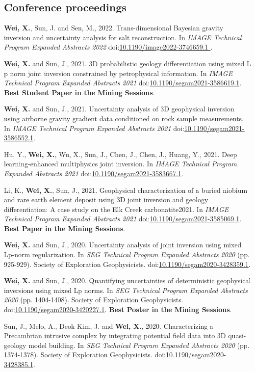 \documentclass[11pt, a4paper]{article}
\newcommand{\LastName}{Wei}
\newcommand{\Initials}{X}
\newcommand{\Wei}{\textbf{\LastName, \Initials.}}  %
\newcommand{\WeiSun}{\textbf{\LastName, \Initials.} and Sun, J.}  %
\newcommand{\DOI}[1]{doi:\href{https://doi.org/#1}{#1}}
\begin{document}
\subsection*{Conference proceedings}
\begin{etaremune}
	
	\item
	\Wei, Sun, J. and Sen, M., 2022. Trans-dimensional Bayesian gravity inversion and uncertainty analysis for salt reconstruction. In \emph{IMAGE Technical Program Expanded Abstracts 2022}  \DOI{10.1190/image2022-3746659.1
	}.

	\item
	\WeiSun, 2021. 3D probabilistic geology differentiation using mixed L p norm joint inversion constrained by petrophysical information. In \emph{IMAGE Technical Program Expanded Abstracts 2021} \DOI{10.1190/segam2021-3586619.1}. \textbf{Best Student Paper in the Mining Sessions}.

	\item
	\WeiSun, 2021. Uncertainty analysis of 3D geophysical inversion using airborne gravity gradient data conditioned on rock sample measurements. In \emph{IMAGE Technical Program Expanded Abstracts 2021} \DOI{10.1190/segam2021-3586552.1}.

	\item
	Hu, Y., \Wei, Wu, X., Sun, J., Chen, J., Chen, J., Huang, Y., 2021. Deep learning-enhanced multiphysics joint inversion. In \emph{IMAGE Technical Program Expanded Abstracts 2021} \DOI{10.1190/segam2021-3583667.1}.

	\item
	Li, K., \Wei, Sun, J., 2021. Geophysical characterization of a buried niobium and rare earth element deposit using 3D joint inversion and geology differentiation: A case study on the Elk Creek carbonatite2021. In \emph{IMAGE Technical Program Expanded Abstracts 2021} \DOI{10.1190/segam2021-3585069.1}. \textbf{Best Paper in the Mining Sessions}.

	\item
	\WeiSun, 2020. Uncertainty analysis of joint inversion using mixed Lp-norm regularization. In \emph{SEG Technical Program Expanded Abstracts 2020} (pp. 925-929). Society of Exploration Geophysicists. \DOI{10.1190/segam2020-3428359.1}.

	\item
	\WeiSun, 2020. Quantifying uncertainties of deterministic geophysical inversions using mixed Lp norms. In \emph{SEG Technical Program Expanded Abstracts 2020} (pp. 1404-1408). Society of Exploration Geophysicists. \DOI{10.1190/segam2020-3420227.1}. \textbf{Best Poster in the Mining Sessions}.

	\item
	Sun, J., Melo, A., Deok Kim, J. and \Wei, 2020. Characterizing a Precambrian intrusive complex by integrating potential field data into 3D quasi-geology model building. In \emph{SEG Technical Program Expanded Abstracts 2020} (pp. 1374-1378). Society of Exploration Geophysicists. \DOI{10.1190/segam2020-3428385.1}.

\end{etaremune}
\end{document}
